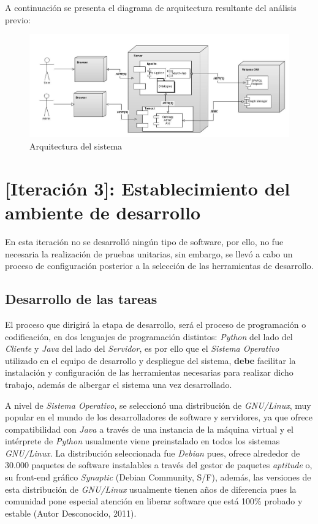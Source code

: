 A continuación se presenta el diagrama de arquitectura resultante del análisis previo:

\begin{figure}
    \begin{center}
        \includegraphics[scale=0.4]{images/sysArch.jpg}
        \caption{Arquitectura del sistema}
        \label{systemArchitecture}
    \end{center}
\end{figure}

\section{[Iteración 3]: Establecimiento del ambiente de desarrollo}
En esta iteración no se desarrolló ningún tipo de software, por ello, no fue necesaria la realización de pruebas unitarias, sin embargo, se llevó a cabo un proceso de configuración posterior a la selección de las herramientas de desarrollo.

\subsection{Desarrollo de las tareas}
El proceso que dirigirá la etapa de desarrollo, será el proceso de programación o codificación, en dos lenguajes de programación distintos: \textit{Python} del lado del \textit{Cliente} y \textit{Java} del lado del \textit{Servidor}, es por ello que el \textit{Sistema Operativo} utilizado en el equipo de desarrollo y despliegue del sistema, \textbf{debe} facilitar la instalación y configuración de las herramientas necesarias para realizar dicho trabajo, además de albergar el sistema una vez desarrollado.

A nivel de \textit{Sistema Operativo}, se seleccionó una distribución de \textit{GNU/Linux}, muy popular en el mundo de los desarrolladores de software y servidores, ya que ofrece compatibilidad con \textit{Java} a través de una instancia de la máquina virtual y el intérprete de \textit{Python} usualmente viene preinstalado en todos los sistemas \textit{GNU/Linux}. La distribución seleccionada fue \textit{Debian} pues, ofrece alrededor de 30.000 paquetes de software instalables a través del gestor de paquetes \textit{aptitude} o, su front-end gráfico \textit{Synaptic} (Debian Community, S/F), además, las versiones de esta distribución de \textit{GNU/Linux} usualmente tienen años de diferencia pues la comunidad pone especial atención en liberar software que está 100\% probado y estable (Autor Desconocido, 2011).

